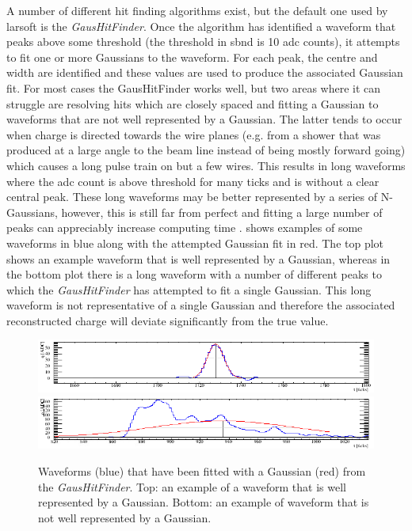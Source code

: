 A number of different hit finding algorithms exist, but the default one used by \gls{larsoft} is the \textit{GausHitFinder}. Once the algorithm has identified a waveform that peaks above some threshold (the threshold in \gls{sbnd} is 10 \gls{adc} counts), it attempts to fit one or more Gaussians to the waveform. For each peak, the centre and width are identified and these values are used to produce the associated Gaussian fit. For most cases the GausHitFinder works well, but two areas where it can struggle are resolving hits which are closely spaced and fitting a Gaussian to waveforms that are not well represented by a Gaussian. The latter tends to occur when charge is directed towards the wire planes (e.g. from a shower that was produced at a large angle to the beam line instead of being mostly forward going) which causes a long pulse train on but a few wires. This results in long waveforms where the \gls{adc} count is above threshold for many ticks and is without a clear central peak. These long waveforms may be better represented by a series of N-Gaussians, however, this is still far from perfect and fitting a large number of peaks can appreciably increase computing time \cite{gaushitfinder}.  shows examples of some waveforms in blue along with the attempted Gaussian fit in red. The top plot shows an example waveform that is well represented by a Gaussian, whereas in the bottom plot there is a long waveform with a number of different peaks to which the \textit{GausHitFinder} has attempted to fit a single Gaussian. This long waveform is not representative of a single Gaussian and therefore the associated reconstructed charge will deviate significantly from the true value.

\begin{figure}[h!]
    \centering
    \includegraphics[width = \largefigwidth]{figures-chap4/good_gauss_fit.png}
    \includegraphics[width = \largefigwidth]{figures-chap4/bad_gauss_fit.png}
    \caption[Example of a well and poorly fitted waveform.]{Waveforms (blue) that have been fitted with a Gaussian (red) from the \textit{GausHitFinder}. Top: an example of a waveform that is well represented by a Gaussian. Bottom: an example of waveform that is not well represented by a Gaussian.}
    \label{fig:fitted_waveforms}
\end{figure}


